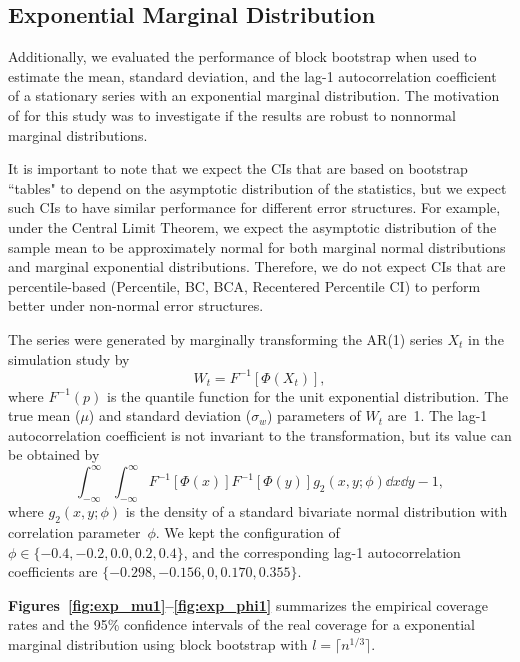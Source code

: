 \documentclass[10pt]{article}
\begin{document}
\subsection*{Exponential Marginal Distribution}
Additionally, we evaluated the performance of block bootstrap when used to 
estimate
the mean, standard deviation, and the lag-1 autocorrelation coefficient of a
stationary series with an exponential marginal distribution. The motivation of
for this study was to investigate if the results are robust to nonnormal
marginal distributions.

It is important to note that we expect the CIs that are based on bootstrap 
``tables" to depend on the 
asymptotic distribution of the statistics, but we expect such CIs to 
have similar performance for different error structures. For example, under the 
Central
Limit Theorem, we expect the asymptotic distribution of the sample mean to be 
approximately 
normal for both marginal normal distributions and marginal exponential 
distributions. Therefore, we do not expect CIs that are percentile-based
(Percentile, BC, BCA, Recentered Percentile CI) to perform better under
non-normal error structures.

The series were generated by marginally transforming the
AR(1) series $X_t$ in the simulation study by
\begin{equation*}
W_t = F^{-1}[\Phi(X_t)],
\end{equation*}
where $F^{-1}(p)$ is the quantile function for the unit exponential 
distribution. The true mean ($\mu$) and standard deviation ($\sigma_w$) 
parameters 
of $W_t$ are~1. The 
lag-1
autocorrelation coefficient is not invariant to the
transformation, \citep{hofert2018elements} but its value can be obtained by
\begin{equation*}
\int_{-\infty}^\infty \int_{-\infty}^\infty F^{-1}[\Phi(x)] F^{-1}[\Phi(y)] g_2(x, y; \phi) \dd x \dd y - 1,
\end{equation*}
where $g_2(x, y; \phi)$ is the density of a standard bivariate normal
distribution with correlation parameter~$\phi$. We kept the configuration of
$\phi \in \{-0.4, -0.2, 0.0, 0.2, 0.4\}$, and the corresponding lag-1
autocorrelation coefficients are $\{-0.298, -0.156, \allowbreak 0, 0.170, 0.355\}$.

\textbf{Figures~\ref{fig:exp_mu1}--\ref{fig:exp_phi1}} 
summarizes the empirical coverage rates and the 95\% confidence intervals of the 
real coverage for a exponential marginal distribution using block bootstrap
with $l = \lceil n^{1/3} \rceil$.
\end{document}

